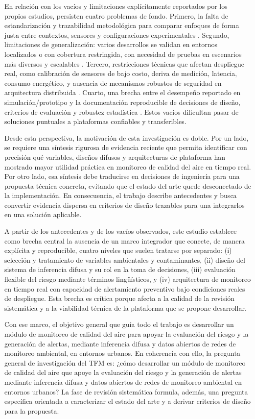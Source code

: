 En relación con los vacíos y limitaciones explícitamente reportados por los propios estudios, persisten cuatro problemas de fondo. Primero, la falta de estandarización y trazabilidad metodológica para comparar enfoques de forma justa entre contextos, sensores y configuraciones experimentales \cite{ART01,ART02}. Segundo, limitaciones de generalización: varios desarrollos se validan en entornos localizados o con cobertura restringida, con necesidad de pruebas en escenarios más diversos y escalables \cite{ART04,ART08}. Tercero, restricciones técnicas que afectan despliegue real, como calibración de sensores de bajo costo, deriva de medición, latencia, consumo energético, y ausencia de mecanismos robustos de seguridad en arquitectura distribuida \cite{ART08}. Cuarto, una brecha entre el desempeño reportado en simulación/prototipo y la documentación reproducible de decisiones de diseño, criterios de evaluación y robustez estadística \cite{ART06,ART07,ART08}. Estos vacíos dificultan pasar de soluciones puntuales a plataformas confiables y transferibles.

Desde esta perspectiva, la motivación de esta investigación es doble. Por un lado, se requiere una síntesis rigurosa de evidencia reciente que permita identificar con precisión qué variables, diseños difusos y arquitecturas de plataforma han mostrado mayor utilidad práctica en monitoreo de calidad del aire en tiempo real. Por otro lado, esa síntesis debe traducirse en decisiones de ingeniería para una propuesta técnica concreta, evitando que el estado del arte quede desconectado de la implementación. En consecuencia, el trabajo describe antecedentes y busca convertir evidencia dispersa en criterios de diseño trazables para una integrarlos en una solución aplicable.

A partir de los antecedentes y de los vacíos observados, este estudio establece como brecha central la ausencia de un marco integrador que conecte, de manera explícita y reproducible, cuatro niveles que suelen tratarse por separado: (i) selección y tratamiento de variables ambientales y contaminantes, (ii) diseño del sistema de inferencia difusa y su rol en la toma de decisiones, (iii) evaluación flexible del riesgo mediante términos lingüísticos, y (iv) arquitectura de monitoreo en tiempo real con capacidad de alertamiento preventivo bajo condiciones reales de despliegue. Esta brecha es crítica porque afecta a la calidad de la revisión sistemática y a la viabilidad técnica de la plataforma que se propone desarrollar.

Con ese marco, el objetivo general que guía todo el trabajo es desarrollar un módulo de monitoreo de calidad del aire para apoyar la evaluación del riesgo y la generación de alertas, mediante inferencia difusa y datos abiertos de redes de monitoreo ambiental, en entornos urbanos. En coherencia con ello, la pregunta general de investigación del TFM es: ¿cómo desarrollar un módulo de monitoreo de calidad del aire que apoye la evaluación del riesgo y la generación de alertas mediante inferencia difusa y datos abiertos de redes de monitoreo ambiental en entornos urbanos? La fase de revisión sistemática formula, además, una pregunta específica orientada a caracterizar el estado del arte y a derivar criterios de diseño para la propuesta.

